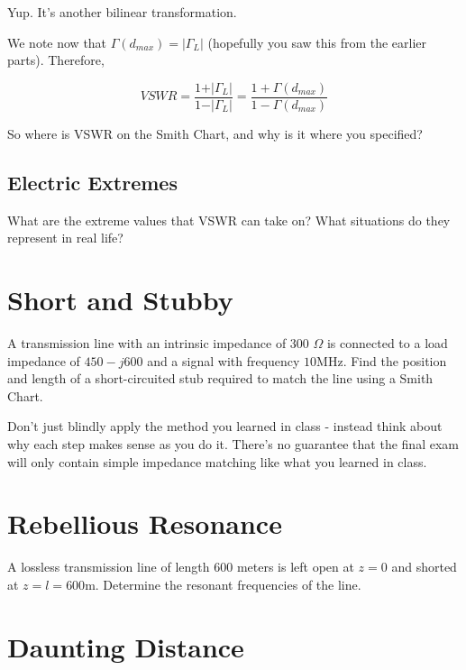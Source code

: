 \documentclass{article}
\begin{document}
Yup. It's another bilinear transformation.

We note now that $\Gamma(d_{max}) = \vert \Gamma_L \vert$ (hopefully you saw this from the earlier parts). Therefore,

$$VSWR = \frac{1 + \vert \Gamma_L \vert}{1 - \vert \Gamma_L \vert} = \frac{1 + \Gamma(d_{max})}{1 - \Gamma(d_{max})}$$

So where is VSWR on the Smith Chart, and why is it where you specified?

\vspace{5cm}

\subsection{Electric Extremes}

What are the extreme values that VSWR can take on? What situations do they represent in real life?

\newpage

\section{Short and Stubby}

A transmission line with an intrinsic impedance of 300 $\Omega$ is connected to a load impedance of $450-j600$ and a signal with frequency $10$MHz. Find the position and length of a short-circuited stub required to match the line using a Smith Chart.

Don't just blindly apply the method you learned in class - instead think about why each step makes sense as you do it. There's no guarantee that the final exam will only contain simple impedance matching like what you learned in class.

\vfill

\section{Rebellious Resonance}

A lossless transmission line of length 600 meters is left open at $z = 0$ and shorted at $z = l = 600$m. Determine the resonant frequencies of the line.

\vfill

\newpage

\section{Daunting Distance}
\end{document}
